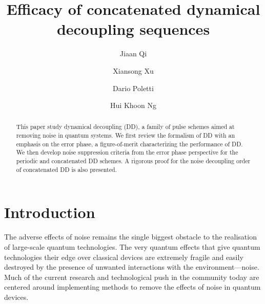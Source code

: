 \documentclass[aps,pra,reprint,superscriptaddress]{revtex4-2}
\begin{document}
\title{Efficacy of concatenated dynamical decoupling sequences}
\author{Jiaan Qi}

\author{Xiansong Xu}
\author{Dario Poletti}
\author{Hui Khoon Ng}


\begin{abstract}
This paper study dynamical decoupling (DD), a family of pulse schemes aimed at removing noise in quantum systems. We first review the formalism of DD with an emphasis on the error phase, a figure-of-merit characterizing the performance of DD. We then develop noise suppression criteria from the error phase perspective for the periodic and concatenated DD schemes. A rigorous proof for the noise decoupling order of  concatenated DD is also presented.
\end{abstract}

\maketitle





\section{Introduction}
The adverse eﬀects of noise remains the single biggest obstacle to the realisation of large-scale quantum technologies. The very quantum eﬀects that give quantum technologies their edge over classical devices are extremely fragile and easily destroyed by the presence of unwanted interactions with the environment—noise. Much of the current research and technological push in the community today are centered around implementing methods to remove the eﬀects of noise in quantum devices.
\end{document}
